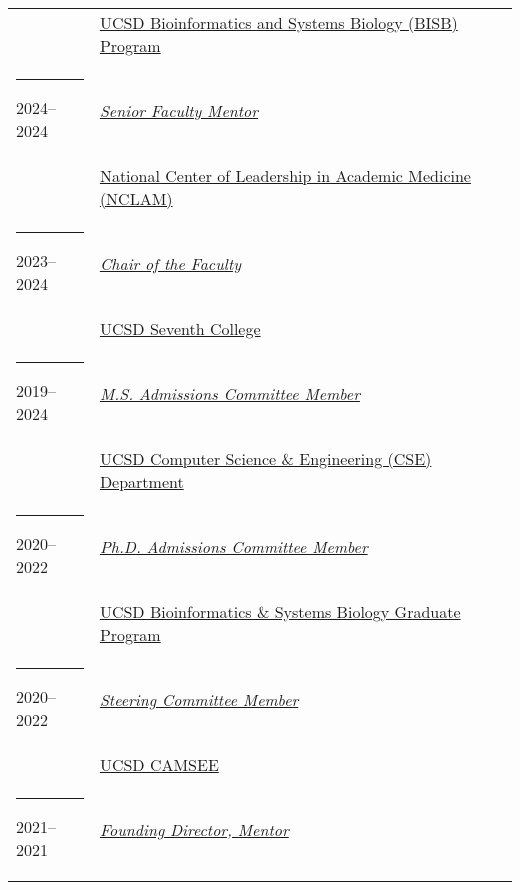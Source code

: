 \documentclass[margin,line]{res}
\begin{document}
\begin{resume}
\begin{longtable}{@{}p{0.7in}p{4in}}
\hspace*{-4mm} & \hspace{4mm} \href{https://bioinformatics.ucsd.edu/}{UCSD Bioinformatics and Systems Biology (BISB) Program}\\
\hspace*{-4mm} \rule{-1mm}{5mm} 2024--2024 & \href{https://medschool.ucsd.edu/vchs/faculty-academics/faculty-affairs/development/nclam/Pages/default.aspx}{\textit{Senior Faculty Mentor}}\\*
\hspace*{-4mm} & \hspace{4mm} \href{https://medschool.ucsd.edu/vchs/faculty-academics/faculty-affairs/development/nclam/Pages/default.aspx}{National Center of Leadership in Academic Medicine (NCLAM)}\\
\hspace*{-4mm} \rule{-1mm}{5mm} 2023--2024 & \href{https://seventh.ucsd.edu/about/faculty/index.html}{\textit{Chair of the Faculty}}\\*
\hspace*{-4mm} & \hspace{4mm} \href{https://seventh.ucsd.edu/}{UCSD Seventh College}\\
\hspace*{-4mm} \rule{-1mm}{5mm} 2019--2024 & \href{https://cse.ucsd.edu/graduate/degree-programs/ms-program}{\textit{M.S. Admissions Committee Member}}\\*
\hspace*{-4mm} & \hspace{4mm} \href{http://cse.ucsd.edu}{UCSD Computer Science \& Engineering (CSE) Department}\\
\hspace*{-4mm} \rule{-1mm}{5mm} 2020--2022 & \href{https://bioinformatics.ucsd.edu/}{\textit{Ph.D. Admissions Committee Member}}\\*
\hspace*{-4mm} & \hspace{4mm} \href{https://bioinformatics.ucsd.edu/}{UCSD Bioinformatics \& Systems Biology Graduate Program}\\
\hspace*{-4mm} \rule{-1mm}{5mm} 2020--2022 & \href{https://camsee.ucsd.edu/}{\textit{Steering Committee Member}}\\*
\hspace*{-4mm} & \hspace{4mm} \href{https://camsee.ucsd.edu/}{UCSD CAMSEE}\\
\hspace*{-4mm} \rule{-1mm}{5mm} 2021--2021 & \href{https://sites.google.com/eng.ucsd.edu/cbam}{\textit{Founding Director, Mentor}}\\*

\end{longtable}
\end{resume}
\end{document}
